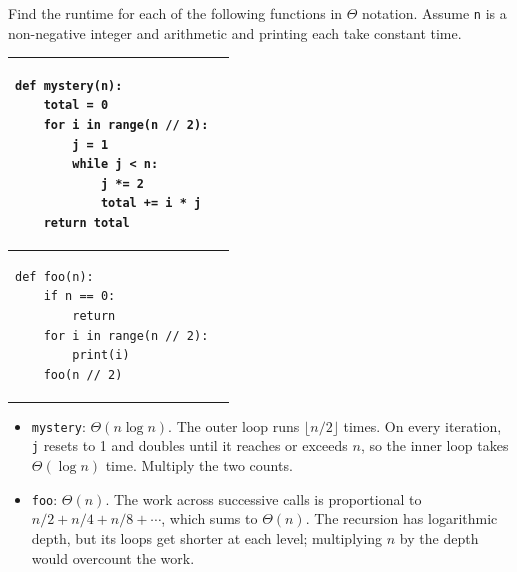 \begin{blocksection}
\question Find the runtime for each of the following functions in
$\Theta$ notation. Assume \lstinline{n} is a non-negative integer and
arithmetic and printing each take constant time.

\begin{center}
\begin{tabular}{ |p{13cm}|p{2cm}| }
\hline
\begin{lstlisting}
def mystery(n):
    total = 0
    for i in range(n // 2):
        j = 1
        while j < n:
            j *= 2
            total += i * j
    return total
\end{lstlisting} &  \\  \hline

\begin{lstlisting}
def foo(n):
    if n == 0:
        return
    for i in range(n // 2):
        print(i)
    foo(n // 2)
\end{lstlisting} &  \\  \hline
\end{tabular}
\end{center}

\end{blocksection}

\begin{solution}
\begin{itemize}
    \item \lstinline{mystery}: $\Theta(n\log n)$. The outer loop runs
    $\lfloor n/2\rfloor$ times. On every iteration, \lstinline{j} resets to
    1 and doubles until it reaches or exceeds $n$, so the inner loop takes
    $\Theta(\log n)$ time. Multiply the two counts.
    \item \lstinline{foo}: $\Theta(n)$. The work across successive calls is
    proportional to $n/2 + n/4 + n/8 + \cdots$, which sums to $\Theta(n)$.
    The recursion has logarithmic depth, but its loops get shorter at each
    level; multiplying $n$ by the depth would overcount the work.
\end{itemize}
\end{solution}
